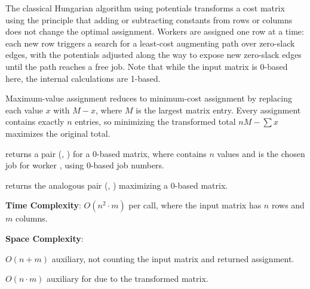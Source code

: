 The classical Hungarian algorithm using potentials transforms a cost matrix using the principle that adding or subtracting constants from rows or columns does not change the optimal assignment. Workers are assigned one row at a time: each new row triggers a search for a least-cost augmenting path over zero-slack edges, with the potentials adjusted along the way to expose new zero-slack edges until the path reaches a free job. Note that while the input matrix is 0-based here, the internal calculations are 1-based.

Maximum-value assignment reduces to minimum-cost assignment by replacing each value $x$ with $M - x$, where $M$ is the largest matrix entry. Every assignment contains exactly $n$ entries, so minimizing the transformed total $nM - \sum x$ maximizes the original total.

\begin{compactitem}
  \item {} returns a pair (, ) for a 0-based  matrix, where  contains $n$ values and  is the chosen job for worker , using 0-based job numbers.
  \item {} returns the analogous pair (, ) maximizing a 0-based  matrix.
\end{compactitem}

\textbf{Time Complexity}: $O(n^{2} \cdot m)$ per call, where the input matrix has $n$ rows and $m$ columns.

\textbf{Space Complexity}:
\begin{compactitem}
  \item $O(n + m)$ auxiliary, not counting the input matrix and returned assignment.
  \item $O(n \cdot m)$ auxiliary for  due to the transformed matrix.
\end{compactitem}

